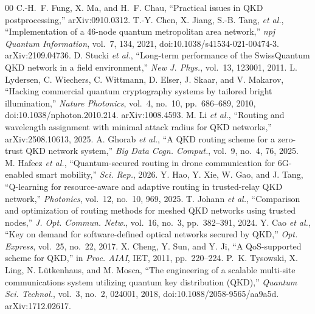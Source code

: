 \documentclass[conference]{IEEEtran}
\begin{document}
\begin{thebibliography}{00}
 C.-H.~F. Fung, X. Ma, and H.~F. Chau, ``Practical issues in QKD postprocessing,'' arXiv:0910.0312.
 T.-Y. Chen, X. Jiang, S.-B. Tang, \emph{et al.}, ``Implementation of a 46-node quantum metropolitan area network,'' \emph{npj Quantum Information}, vol.~7, 134, 2021, doi:10.1038/s41534-021-00474-3. arXiv:2109.04736. %
 D. Stucki \emph{et al.}, ``Long-term performance of the SwissQuantum QKD network in a field environment,'' \emph{New J. Phys.}, vol.~13, 123001, 2011.
 L. Lydersen, C. Wiechers, C. Wittmann, D. Elser, J. Skaar, and V. Makarov, ``Hacking commercial quantum cryptography systems by tailored bright illumination,'' \emph{Nature Photonics}, vol.~4, no.~10, pp.~686--689, 2010, doi:10.1038/nphoton.2010.214. arXiv:1008.4593. %
 M. Li \emph{et al.}, ``Routing and wavelength assignment with minimal attack radius for QKD networks,'' arXiv:2508.10613, 2025.
 A. Ghorab \emph{et al.}, ``A QKD routing scheme for a zero-trust QKD network system,'' \emph{Big Data Cogn. Comput.}, vol.~9, no.~4, 76, 2025.
 M. Hafeez \emph{et al.}, ``Quantum-secured routing in drone communication for 6G-enabled smart mobility,'' \emph{Sci. Rep.}, 2026.
 Y. Hao, Y. Xie, W. Gao, and J. Tang, ``Q-learning for resource-aware and adaptive routing in trusted-relay QKD network,'' \emph{Photonics}, vol.~12, no.~10, 969, 2025.
 T. Johann \emph{et al.}, ``Comparison and optimization of routing methods for meshed QKD networks using trusted nodes,'' \emph{J. Opt. Commun. Netw.}, vol.~16, no.~3, pp.~382--391, 2024.
 Y. Cao \emph{et al.}, ``Key on demand for software-defined optical networks secured by QKD,'' \emph{Opt. Express}, vol.~25, no.~22, 2017.
 X. Cheng, Y. Sun, and Y. Ji, ``A QoS-supported scheme for QKD,'' in \emph{Proc. AIAI}, IET, 2011, pp.~220--224. %
 P.~K. Tysowski, X. Ling, N. L\"utkenhaus, and M. Mosca, ``The engineering of a scalable multi-site communications system utilizing quantum key distribution (QKD),'' \emph{Quantum Sci. Technol.}, vol.~3, no.~2, 024001, 2018, doi:10.1088/2058-9565/aa9a5d. arXiv:1712.02617. %

\end{thebibliography}
\end{document}
